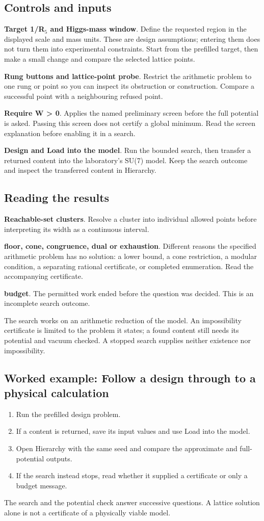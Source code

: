 \documentclass[11pt,a4paper]{article}
\begin{document}
\subsection*{Controls and inputs}
\textbf{Target 1/R\ensuremath{{}_{5}} and Higgs-mass window}. Define the requested region in the displayed scale and mass units. These are design assumptions; entering them does not turn them into experimental constraints. Start from the prefilled target, then make a small change and compare the selected lattice points.

\textbf{Rung buttons and lattice-point probe}. Restrict the arithmetic problem to one rung or point so you can inspect its obstruction or construction. Compare a successful point with a neighbouring refused point.

\textbf{Require W > 0}. Applies the named preliminary screen before the full potential is asked. Passing this screen does not certify a global minimum. Read the screen explanation before enabling it in a search.

\textbf{Design and Load into the model}. Run the bounded search, then transfer a returned content into the laboratory's SU(7) model. Keep the search outcome and inspect the transferred content in Hierarchy.

\subsection*{Reading the results}
\textbf{Reachable-set clusters}. Resolve a cluster into individual allowed points before interpreting its width as a continuous interval.

\textbf{floor, cone, congruence, dual or exhaustion}. Different reasons the specified arithmetic problem has no solution: a lower bound, a cone restriction, a modular condition, a separating rational certificate, or completed enumeration. Read the accompanying certificate.

\textbf{budget}. The permitted work ended before the question was decided. This is an incomplete search outcome.

The search works on an arithmetic reduction of the model. An impossibility certificate is limited to the problem it states; a found content still needs its potential and vacuum checked. A stopped search supplies neither existence nor impossibility.
\subsection*{Worked example: Follow a design through to a physical calculation}
\begin{enumerate}
\item Run the prefilled design problem.
\item If a content is returned, save its input values and use Load into the model.
\item Open Hierarchy with the same seed and compare the approximate and full-potential outputs.
\item If the search instead stops, read whether it supplied a certificate or only a budget message.
\end{enumerate}
The search and the potential check answer successive questions. A lattice solution alone is not a certificate of a physically viable model.
\end{document}
